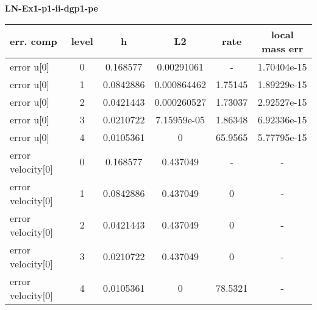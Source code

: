 \documentclass{amsart}
\begin{document}
\begin{center}   
{\bf LN-Ex1-p1-ii-dgp1-pe }\end{center}  
\tableofcontents

\begin{table}[h!]
\begin{tabular}{|l|c|c|c|c|c|}
\hline
err. comp & level & h  & L2 & rate  & local mass err \\ 
\hline
error u[0] & 0 & 0.168577  & 0.00291061 & -   &  1.70404e-15 \\ 
error u[0] & 1 & 0.0842886 & 0.000864462 & 1.75145   &  1.89229e-15 \\ 
error u[0] & 2 & 0.0421443 & 0.000260527 & 1.73037   &  2.92527e-15 \\ 
error u[0] & 3 & 0.0210722 & 7.15959e-05 & 1.86348   &  6.92336e-15 \\ 
error u[0] & 4 & 0.0105361 & 0 & 65.9565   &  5.77795e-15 \\ 
error velocity[0] & 0 & 0.168577  & 0.437049 & -   & - \\ 
error velocity[0] & 1 & 0.0842886 & 0.437049 & 0   & - \\ 
error velocity[0] & 2 & 0.0421443 & 0.437049 & 0   & - \\ 
error velocity[0] & 3 & 0.0210722 & 0.437049 & 0   & - \\ 
error velocity[0] & 4 & 0.0105361 & 0 & 78.5321   & - \\ 

\hline
\end{tabular}
\end{table}
\end{document}
